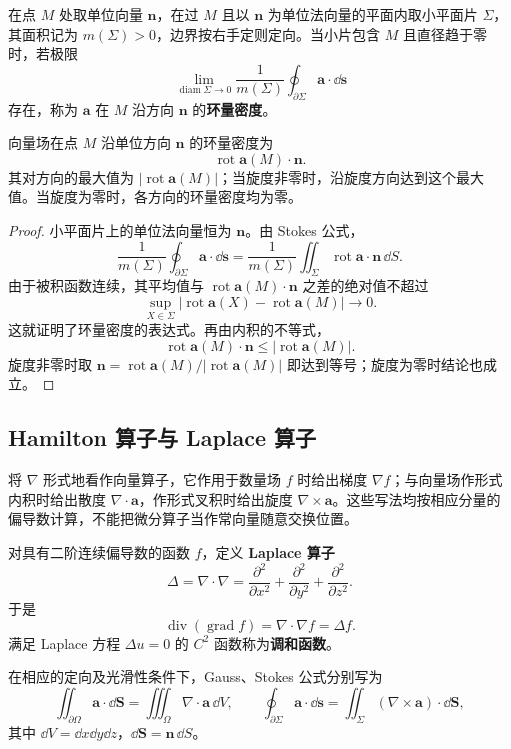 在点 $M$ 处取单位向量 $\boldsymbol n$，在过 $M$ 且以 $\boldsymbol n$ 为单位法向量的平面内取小平面片 $\Sigma$，其面积记为 $m(\Sigma)>0$，边界按右手定则定向。当小片包含 $M$ 且直径趋于零时，若极限
\[
\lim_{\operatorname{diam}\Sigma\to0}
\frac1{m(\Sigma)}\oint_{\partial\Sigma}\boldsymbol a\cdot\dd\boldsymbol s
\]
存在，称为 $\boldsymbol a$ 在 $M$ 沿方向 $\boldsymbol n$ 的\textbf{环量密度}。

\begin{theorem}
向量场在点 $M$ 沿单位方向 $\boldsymbol n$ 的环量密度为
\[
\operatorname{rot}\boldsymbol a(M)\cdot\boldsymbol n.
\]
其对方向的最大值为 $|\operatorname{rot}\boldsymbol a(M)|$；当旋度非零时，沿旋度方向达到这个最大值。当旋度为零时，各方向的环量密度均为零。
\end{theorem}
\begin{proof}
小平面片上的单位法向量恒为 $\boldsymbol n$。由 Stokes 公式，
\[
\frac1{m(\Sigma)}\oint_{\partial\Sigma}\boldsymbol a\cdot\dd\boldsymbol s
=\frac1{m(\Sigma)}\displaystyle\iint_\Sigma\operatorname{rot}\boldsymbol a\cdot\boldsymbol n\,\dd S.
\]
由于被积函数连续，其平均值与 $\operatorname{rot}\boldsymbol a(M)\cdot\boldsymbol n$ 之差的绝对值不超过
\[
\sup_{X\in\Sigma}|\operatorname{rot}\boldsymbol a(X)-\operatorname{rot}\boldsymbol a(M)|\longrightarrow0.
\]
这就证明了环量密度的表达式。再由内积的不等式，
\[
\operatorname{rot}\boldsymbol a(M)\cdot\boldsymbol n
\le |\operatorname{rot}\boldsymbol a(M)|.
\]
旋度非零时取 $\boldsymbol n=\operatorname{rot}\boldsymbol a(M)/|\operatorname{rot}\boldsymbol a(M)|$ 即达到等号；旋度为零时结论也成立。
\end{proof}

\subsection*{Hamilton 算子与 Laplace 算子}
将 $\nabla$ 形式地看作向量算子，它作用于数量场 $f$ 时给出梯度 $\nabla f$；与向量场作形式内积时给出散度 $\nabla\cdot\boldsymbol a$，作形式叉积时给出旋度 $\nabla\times\boldsymbol a$。这些写法均按相应分量的偏导数计算，不能把微分算子当作常向量随意交换位置。

\begin{definition}
对具有二阶连续偏导数的函数 $f$，定义 \textbf{Laplace 算子}
\[
\Delta=\nabla\cdot\nabla
=\frac{\partial^2}{\partial x^2}+\frac{\partial^2}{\partial y^2}+\frac{\partial^2}{\partial z^2}.
\]
于是
\[
\operatorname{div}(\operatorname{grad}f)=\nabla\cdot\nabla f=\Delta f.
\]
满足 Laplace 方程 $\Delta u=0$ 的 $C^2$ 函数称为\textbf{调和函数}。
\end{definition}
在相应的定向及光滑性条件下，Gauss、Stokes 公式分别写为
\[
\displaystyle\iint_{\partial\Omega}\boldsymbol a\cdot\dd\boldsymbol S
=\iiint_\Omega\nabla\cdot\boldsymbol a\,\dd V,
\qquad
\oint_{\partial\Sigma}\boldsymbol a\cdot\dd\boldsymbol s
=\displaystyle\iint_\Sigma(\nabla\times\boldsymbol a)\cdot\dd\boldsymbol S,
\]
其中 $\dd V=\dd x\dd y\dd z$，$\dd\boldsymbol S=\boldsymbol n\,\dd S$。

